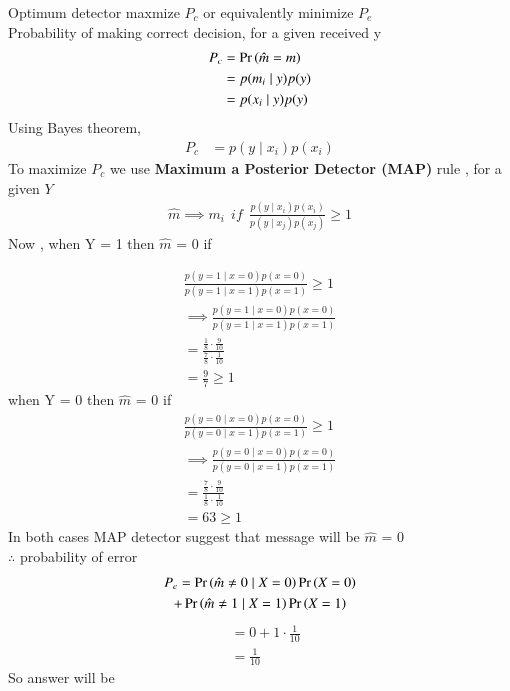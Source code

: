 Optimum detector maxmize $P_c$ or equivalently minimize $P_e$ \\ Probability of making correct decision, for a given received y 
\begin{align}
    P_c & = \Pr\left(\hat{m} = m\right) \\
        & = p(m_i \mid y) p(y) \\
        & = p(x_i \mid y) p(y)
\end{align}
Using Bayes theorem,
\begin{align}
    P_c & = p(y \mid x_i) p(x_i)
\end{align}
To maximize $P_c$ we use \textbf{Maximum a Posterior Detector (MAP)} rule , for a given $Y$
\begin{align}
    \hat{m} \implies m_i \ \ if \ \ \frac{p(y \mid x_i) p(x_i)}{p(y \mid x_j) p(x_j)} \geq 1
\end{align}
Now , when Y = 1 then $\hat{m}$ = 0 if
 
\begin{align}
    \frac{p(y = 1 \mid x = 0) p(x=0)}{p(y =1  \mid x = 1) p(x=1)} \geq 1 \\
\implies  \frac{p(y = 1 \mid x = 0) p(x=0)}{p(y =1  \mid x = 1) p(x=1)} \\
= \frac{\frac{1}{8} \cdot \frac{9}{10}}{\frac{7}{8} \cdot \frac{1}{10}}  \\
= \frac{9}{7} \geq 1
\end{align}
when Y = 0 then $\hat{m}$ = 0 if
\begin{align}
        \frac{p(y = 0 \mid x = 0) p(x=0)}{p(y = 0  \mid x = 1) p(x=1)} \geq 1 \\
\implies  \frac{p(y = 0 \mid x = 0) p(x=0)}{p(y = 0 \mid x = 1) p(x=1)} \\
= \frac{\frac{7}{8} \cdot \frac{9}{10}}{\frac{1}{8} \cdot \frac{1}{10}}  \\
= 63 \geq 1        
\end{align}
In both cases MAP detector suggest that message will be $\hat{m}$ = 0 \\
$\therefore$ probability of error 
\begin{multline}
    P_e  = \Pr\left(\hat{m} \neq 0 \mid X = 0 \right) \Pr\left(X = 0\right) \\ + \Pr\left(\hat{m} \neq 1 \mid X = 1\right) \Pr\left(X = 1\right) 
\end{multline}
\begin{align}    
    & = 0 + 1 \cdot \frac{1}{10} \\
    & = \frac{1}{10} 
\end{align}
So answer will be 